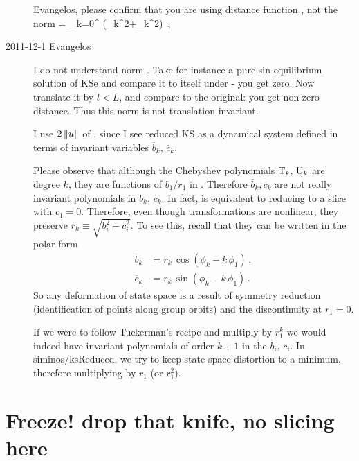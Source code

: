 \begin{description}
Evangelos, please confirm that you are using distance function ,
not the norm
\beq
{}  =   {\textstyle{}} \sum_{k=0}^{\infty}
   (_k^2+_k^2)
\,,
\label{normNotGood} \eeq

\item[2011-12-1 Evangelos] I do not understand norm . Take for instance a pure sin
equilibrium solution of KSe and compare it to itself under  - you get zero. Now
translate it by $l<L$, and compare to the original: you get non-zero distance. Thus this norm is
not translation invariant.

I use $2\,\|{u}\|$ of , since I see reduced KS as a dynamical system defined in terms of invariant
variables $\overline{b}_k,\,\overline{c}_k$.

Please observe that although the Chebyshev polynomials $\mathrm{T}_k,\,\mathrm{U}_k$ are degree $k$,
they are functions of $b_1/r_1$ in . Therefore
$\overline{b}_k, \overline{c}_k $ are not really invariant polynomials in $b_k,\,c_k$.
In fact,  is equivalent to reducing to a slice with $c_1=0$.
Therefore, even though transformations  are nonlinear,
they preserve  $r_k\equiv\sqrt{b_i^2+c_i^2}$. To see this, recall that they can
be written in the polar form
\bseq\label{eq:SO2polar0}
  \begin{align}
    \overline{b}_k &=
		    r_k\, \cos(\phi_k-k\,\phi_1)\,, \label{eq:SO2polar1}\\
    \overline{c}_k &=
		    r_k\, \sin(\phi_k-k\,\phi_1)\,.\label{eq:SO2polar2}
  \end{align}
\eseq
So any deformation of state space is a result of symmetry reduction (identification of points
along group orbits) and the discontinuity at $r_1=0$.

If we were to follow Tuckerman's recipe and multiply  by $r_1^k$ we would indeed
have invariant polynomials of order $k+1$ in the $b_i,\,c_i$. In siminos/ksReduced, we try to keep
state-space distortion to a minimum, therefore multiplying by $r_1$ (or $r_1^2$).


\end{description}

\section{Freeze! drop that knife, no slicing here}
\label{sect:freeze}
\renewcommand{\LieElrep}{\ensuremath{g}} %

